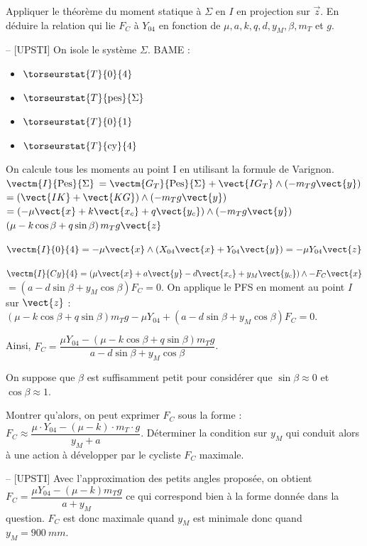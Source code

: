 \begin{question}Appliquer le théorème du moment statique à \(\Sigma\) en \(I\) en projection sur \(\vec{z}\). En déduire la relation qui lie \(F_{C}\) à \(Y_{04}\) en fonction de \(\mu, a, k, q, d, y_{M}, \beta, m_{T}\) et \(g\).
\end{question}
\ifprof
\begin{corrige}-- [UPSTI]
On isole le système ${\Sigma}$.
BAME :
\begin{itemize}
\item $\torseurstat{T}{0}{4}$
\item $\torseurstat{T}{\text{pes}}{\Sigma}$
\item $\torseurstat{T}{0}{1}$
\item $\torseurstat{T}{\text{cy}}{4}$
\end{itemize}

On calcule tous les moments au point I en utilisant la formule de Varignon.
$\vectm{I}{\text{Pes}}{\Sigma} $
$= \vectm{G_T}{\text{Pes}}{\Sigma} + \vect{IG_T}\wedge \left(-m_T g\vect{y}\right)$
$=\left(\vect{IK}+\vect{KG}\right) \wedge \left(-m_T g\vect{y}\right)$
$ = \left(-\mu \vect{x} + k\vect{x_c}+q\vect{y_c}\right) \wedge \left(-m_T g\vect{y}\right)$
$\left(\mu -k\cos\beta+q\sin\beta \right) m_T g\vect{z}$

$\vectm{I}{0}{4} = -\mu \vect{x} \wedge \left(X_{04}\vect{x}+Y_{04}\vect{y}\right) =-\mu Y_{04}\vect{z}$

$\vectm{I}{Cy}{4} =\left(\mu \vect{x} + a\vect{y} - d\vect{x_c} +y_M \vect{y_c}\right) \wedge -F_C\vect{x}$
$=(a-d\sin\beta +y_M \cos\beta) F_C = 0$.
On applique le PFS en moment au point $I$ sur $\vect{z}$ : 
$\left(\mu -k\cos\beta+q\sin\beta \right) m_T g - \mu Y_{04}+\left(a-d\sin\beta +y_M \cos\beta\right) F_C = 0$.

Ainsi, $F_C=\dfrac{\mu Y_{04}-(\mu -k\cos\beta +q\sin\beta) m_T g}{a-d\sin\beta+y_M \cos\beta}$.

\end{corrige}
\else
\fi

On suppose que \(\beta\) est suffisamment petit pour considérer que \(\sin \beta \approx 0\) et \(\cos \beta \approx 1\).\\


\begin{question}Montrer qu'alors, on peut exprimer \(F_{C}\) sous la forme :
$F_{C} \approx \dfrac{\mu \cdot Y_{04}-(\mu-k) \cdot m_{T} \cdot g}{y_{M}+a}$.
Déterminer la condition sur \(y_{M}\) qui conduit alors à une action à développer par le cycliste \(F_{C}\) maximale.
\end{question}
\ifprof
\begin{corrige}-- [UPSTI]
Avec l’approximation des petits angles proposée, on obtient $F_C= \dfrac{\mu Y_{04}-(\mu -k) m_T g}{a+y_M}$ ce qui correspond bien à la forme donnée dans la question.
$F_C$ est donc maximale quand $y_M$ est minimale donc quand $y_M=\SI{900}{mm}$.
\end{corrige}
\else
\fi

